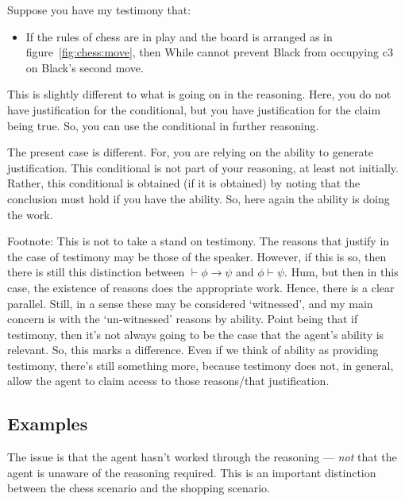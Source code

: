 \documentclass[10pt]{article}
\begin{document}
\begin{note}
  Suppose you have my testimony that:
  \begin{itemize}
  \item If the rules of chess are in play and the board is arranged as in figure~\ref{fig:chess:move}, then While cannot prevent Black from occupying c3 on Black's second move.
  \end{itemize}

  This is slightly different to what is going on in the reasoning.
  Here, you do not have justification for the conditional, but you have justification for the claim being true.
  So, you can use the conditional in further reasoning.

  The present case is different.
  For, you are relying on the ability to generate justification.
  This conditional is not part of your reasoning, at least not initially.
  Rather, this conditional is obtained (if it is obtained) by noting that the conclusion must hold if you have the ability.
  So, here again the ability is doing the work.

  {
    \color{red}
    Footnote:
    This is not to take a stand on testimony.
    The reasons that justify in the case of testimony may be those of the speaker.
    However, if this is so, then there is still this distinction between \(\vdash \phi \rightarrow \psi\) and \(\phi \vdash \psi\).
    Hum, but then in this case, the existence of reasons does the appropriate work.
    Hence, there is a clear parallel.
    Still, in a sense these may be considered `witnessed', and my main concern is with the `un-witnessed' reasons by ability.
    Point being that if testimony, then it's not always going to be the case that the agent's ability is relevant.
    So, this marks a difference.
    Even if we think of ability as providing testimony, there's still something more, because testimony does not, in general, allow the agent to claim access to those reasons/that justification.
  }
\end{note}

\subsection{Examples}
\label{sec:examples}

\begin{note}
   The issue is that the agent hasn't worked through the reasoning --- \emph{not} that the agent is unaware of the reasoning required.
  This is an important distinction between the chess scenario and the shopping scenario.
\end{note}
\end{document}
